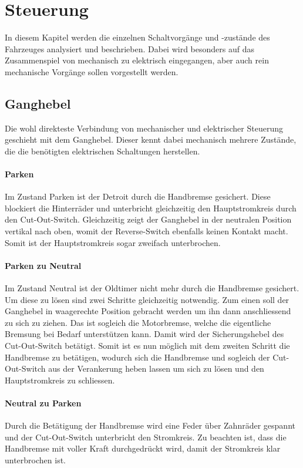 \section{Steuerung}
In diesem Kapitel werden die einzelnen Schaltvorgänge und -zustände des Fahrzeuges analysiert und beschrieben. Dabei wird besonders auf das Zusammenspiel von mechanisch zu elektrisch eingegangen, aber auch rein mechanische Vorgänge sollen vorgestellt werden.

\subsection{Ganghebel}
Die wohl direkteste Verbindung von mechanischer und elektrischer Steuerung geschieht mit dem Ganghebel. Dieser kennt dabei mechanisch mehrere Zustände, die die benötigten elektrischen Schaltungen herstellen.

\paragraph{Parken}
Im Zustand Parken ist der Detroit durch die Handbremse gesichert. Diese blockiert die Hinterräder und unterbricht gleichzeitig den Hauptstromkreis durch den Cut-Out-Switch. Gleichzeitig zeigt der Ganghebel in der neutralen Position vertikal nach oben, womit der Reverse-Switch ebenfalls keinen Kontakt macht. Somit ist der Hauptstromkreis sogar zweifach unterbrochen.

\paragraph{Parken zu Neutral}
Im Zustand Neutral ist der Oldtimer nicht mehr durch die Handbremse gesichert. Um diese zu lösen sind zwei Schritte gleichzeitig notwendig. Zum einen soll der Ganghebel in waagerechte Position gebracht werden um ihn dann anschliessend zu sich zu ziehen. Das ist sogleich die Motorbremse, welche die eigentliche Bremsung bei Bedarf unterstützen kann. Damit wird der Sicherungshebel des Cut-Out-Switch betätigt. Somit ist es nun möglich mit dem zweiten Schritt die Handbremse zu betätigen, wodurch sich die Handbremse und sogleich der Cut-Out-Switch aus der Verankerung heben lassen um sich zu lösen und den Hauptstromkreis zu schliessen.

\paragraph{Neutral zu Parken}
Durch die Betätigung der Handbremse wird eine Feder über Zahnräder gespannt und der Cut-Out-Switch unterbricht den Stromkreis. Zu beachten ist, dass die Handbremse mit voller Kraft durchgedrückt wird, damit der Stromkreis klar unterbrochen ist.

